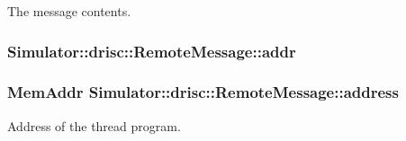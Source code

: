 The message contents. 

\hypertarget{struct_simulator_1_1drisc_1_1_remote_message_a1c5b05a5ac533c711dabcfd4461e5f0f}{
\subsubsection[{addr}]{ Simulator\+::drisc\+::\+Remote\+Message\+::addr}}\label{struct_simulator_1_1drisc_1_1_remote_message_a1c5b05a5ac533c711dabcfd4461e5f0f}
\hypertarget{struct_simulator_1_1drisc_1_1_remote_message_a2ded3519deb2fd4a161154f9504d20b9}{
\subsubsection[{address}]{\setlength{\rightskip}{0pt plus 5cm}Mem\+Addr Simulator\+::drisc\+::\+Remote\+Message\+::address}}\label{struct_simulator_1_1drisc_1_1_remote_message_a2ded3519deb2fd4a161154f9504d20b9}


Address of the thread program. 

